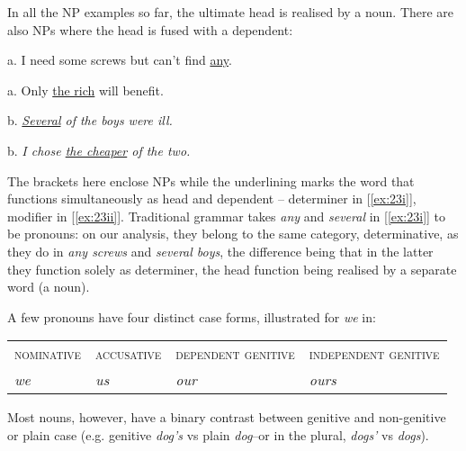 \newpage
{}
In all the NP examples so far, the ultimate head is realised by a noun. There are also NPs where the head is fused with a dependent:
\begin{examples}
\item \label{ex:23}
\noindent\begin{minipage}[t]{0.55\linewidth}
    \begin{examples}[nosep]\vspace{-6pt}
        \item \label{ex:23i}{
            \textnormal{a.} I need some screws but can't find \ob\uline{any}\cb.}
        \item \label{ex:23ii}
            \textnormal{a.} \ob Only \uline{the rich} will benefit\cb.
    \end{examples}
\end{minipage}\vspace{-\medskipamount}%
\begin{minipage}[t]{0.5\linewidth}
    b. \ob\textit{\uline{Several} of the boys were ill\cb.}
    
    \textnormal{b.} \textit{I chose \ob\uline{the cheaper} of the two\cb.}
\end{minipage}
\end{examples}
The brackets here enclose NPs while the underlining marks the word that functions simultaneously as head and dependent -- determiner in [\ref{ex:23i}], modifier in [\ref{ex:23ii}]. Traditional grammar takes \textit{any} and \textit{several} in [\ref{ex:23i}] to be pronouns: on our analysis, they belong to the same category, determinative, as they do in \textit{any screws} and \textit{several boys}, the difference being that in the latter they function solely as determiner, the head function being realised by a separate word (a noun).

A few pronouns have four distinct case forms, illustrated for \textit{we} in:
\begin{examples}
\item \label{ex:24}
\begin{tabular}{llll}
\textsc{nominative} & \textsc{accusative} & \textsc{dependent genitive} & \textsc{independent genitive} \\
\textit{we} & \textit{us} & \textit{our} & \textit{ours}
\end{tabular}
\end{examples}
Most nouns, however, have a binary contrast between genitive and non-genitive or plain case (e.g. genitive \textit{dog's} vs plain \textit{dog}--or in the plural, \textit{dogs'} vs \textit{dogs}).

